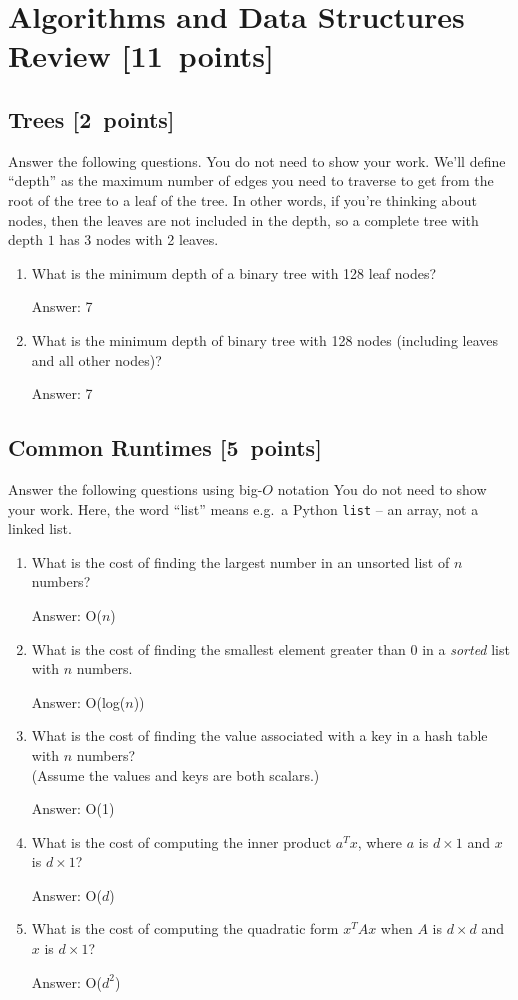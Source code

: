 \documentclass{article}
\newcommand{\blu}[1]{{\textcolor{blu}{#1}}}
\newcommand{\gre}[1]{\textcolor{gre}{#1}}
\newcommand\ans[1]{\par\gre{Answer: #1}}
\let\ask\blu
\newcommand\pts[1]{\textcolor{pointscolour}{[#1~points]}}
\begin{document}
  \clearpage\section{Algorithms and Data Structures Review \pts{11}}

  \subsection{Trees \pts{2}}

  \ask{Answer the following questions.} You do not need to show your work. We'll define ``depth'' as the maximum number of edges you need to traverse to get from the root of the tree to a leaf of the tree. In other words, if you're thinking about nodes, then the leaves are not included in the depth, so a complete tree with depth $1$ has 3 nodes with 2 leaves.


  \begin{enumerate}
  \item What is the minimum depth of a binary tree with 128 leaf nodes?
  \ans{7}
  \item What is the minimum depth of binary tree with 128 nodes (including leaves and all other nodes)?
  \ans{7}
  \end{enumerate}

  \subsection{Common Runtimes \pts{5}}

  \ask{Answer the following questions using big-$O$ notation} You do not need to show your work.
  Here, the word ``list'' means e.g.\ a Python \texttt{list} -- an array, not a linked list.
  \begin{enumerate}
  \item What is the cost of finding the largest number in an unsorted list of $n$ numbers?
  \ans{O($n$)}
  \item What is the cost of finding the smallest element greater than 0 in a \emph{sorted} list with $n$ numbers.
  \ans{O(log($n$))}
  \item What is the cost of finding the value associated with a key in a hash table with $n$ numbers? \\(Assume the values and keys are both scalars.)
  \ans{O(1)}
  \item What is the cost of computing the inner product $a^Tx$, where $a$ is $d \times 1$ and $x$ is $d \times 1$?
  \ans{O($d$)}
  \item What is the cost of computing the quadratic form $x^TAx$ when $A$ is $d \times d$ and $x$ is $d \times 1$?
  \ans{O($d^2$)}
  \end{enumerate}
  
\end{document}
